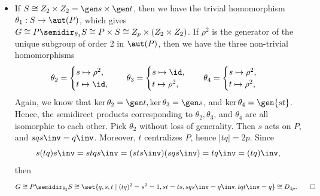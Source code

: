 \begin{sol}
\begin{itemize}
        If $p \equiv 1 \bmod 4$, then $p - 1 \equiv 0 \bmod 4$, hence $\phi(s)$ can be sent to $\id$ or one of the two elements of order 4 in $\aut(P)$ (which are isomorphic since their images generate the same subgroup), or the unique element of order 2 in $\aut(P)$.
	    If $\aut(P) = \gen\alpha$, let $\rho = \alpha^{(p - 1)/4}$, which has order 4.
	    Then we have the three non-trivial homomorphisms
        \[
        	\phi_1 : s \mapsto \rho, \quad \phi_2 : s \mapsto \rho^3, \quad \phi_3 : s \mapsto \rho^2.
        \]
        We know that $\phi_1$ and $\phi_2$ give isomorphic semidirect products, since $\phi_1(S) = \phi_2(S) = \gen\rho$.
	    Hence, we have two non-Abelian groups of order $4p$, and we have
        \[
        	G \cong P \semidir_{\phi_1} S \cong \set{q, s \mid q^p = s^4 = 1, sqs\inv = q^k},
        \]
        for some $k \in \units[p]$ such that $|k| = 4$.
	    In the case of $\phi_3$, we have $sqs\inv = q\inv$.
	    Then
        \[
        	G \cong P \semidir_{\phi_3} S \cong \set{q, s \mid q^p = s^4 = 1, sqs\inv = q\inv}.
        \]
        \item If $S \cong Z_2 \times Z_2 = \gen s \times \gen t$, then we have the trivial homomorphism $\theta_1 : S \to \aut(P)$, which gives $G \cong P \semidir_{\theta_1} S \cong P \times S \cong Z_p \times (Z_2 \times Z_2)$.
	    If $\rho^2$ is the generator of the unique subgroup of order 2 in $\aut(P)$, then we have the three non-trivial homomorphisms
        \[
        	\theta_2 = 
            \begin{cases}
                s \mapsto \rho^2, \\
                t \mapsto \id,
            \end{cases} \quad
            \theta_3 =
            \begin{cases}
                s \mapsto \id, \\
                t \mapsto \rho^2,
            \end{cases} \quad
            \theta_4 =
            \begin{cases}
                s \mapsto \rho^2, \\
                t \mapsto \rho^2,
            \end{cases}
        \]
        Again, we know that $\ker\theta_2 = \gen t, \ker\theta_3 = \gen s$, and $\ker\theta_4 = \gen{st}$.
        Hence, the semidirect products corresponding to $\theta_2, \theta_3$, and $\theta_4$ are all isomorphic to each other.
        Pick $\theta_2$ without loss of generality.
        Then $s$ acts on $P$, and $sqs\inv = q\inv$.
        Moreover, $t$ centralizes $P$, hence $|tq| = 2p$.
        Since
        \[
        	s(tq)s\inv = stqs\inv = (sts\inv)(sqs\inv) = tq\inv = (tq)\inv,
        \]
        then
        \[
        	G \cong P \semidir_{\theta_2} S \cong \set{q, s, t \mid (tq)^2 = s^2 = 1, st = ts, sqs\inv = q\inv, tqt\inv = q} \cong D_{4p}. \qedhere
        \]
    \end{itemize}
\end{sol}

